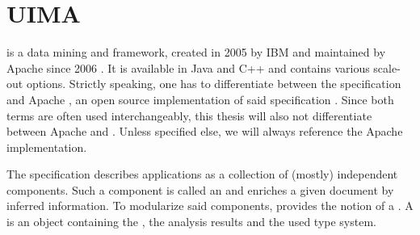 
\section{UIMA}
\uima{} is a data mining and \nlp{} framework, created in 2005 by IBM \cite{ferrucci2004uima} and maintained by Apache since 2006 \cite{uimacpe}. It is available in Java and C++ and contains various scale-out options. 
Strictly speaking, one has to differentiate between the \uima{} specification and Apache \uima{}, an open source implementation of said specification \cite{OASIS:UIMA:2009}. Since both terms are often used interchangeably, this thesis will also not differentiate between Apache \uima{} and \uima{}. Unless specified else, we will always reference the Apache \uima{} implementation.

The \uima{} specification describes \nlp{} applications as a collection of (mostly) independent components. Such a component is called an \anen{} and enriches a given document by inferred information. To modularize said components, \uima{} provides the notion of a \cas{}. A \cas{} is an object containing the \sofa{}, the analysis results and the used type system.


